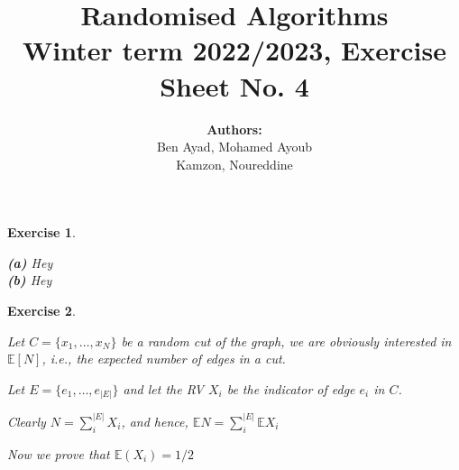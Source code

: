 \documentclass{article}
\title{Randomised Algorithms \\
Winter term 2022/2023, Exercise Sheet No. 4}
\author{
    \textbf{Authors:} \\
    Ben Ayad, Mohamed Ayoub \\
    Kamzon, Noureddine
}
\newtheorem{exo}{Exercise}
\def\E{\mathbb{E}}
\begin{document}
\maketitle


\begin{exo}{\ \\}

\noindent
\textbf{(a)} Hey \\


\noindent
\textbf{(b)} Hey \\


\end{exo}

\begin{exo}{\ \\}

Let $C = \{x_1, \dots, x_N\}$ be a random cut of the graph, we are obviously interested in $\E[N]$, i.e., the expected number of edges in a cut.

Let $E = \{e_1, \dots, e_{|E|}\}$ and let the RV $X_i$ be the indicator of edge $e_i$ in $C$.


Clearly $N = \sum_{i}^{|E|} X_i$, and hence, $\E{N}= \sum_i^{|E|} \E X_i$

Now we prove that $\E (X_i) = 1/2$ 
\end{exo}
\end{document}
